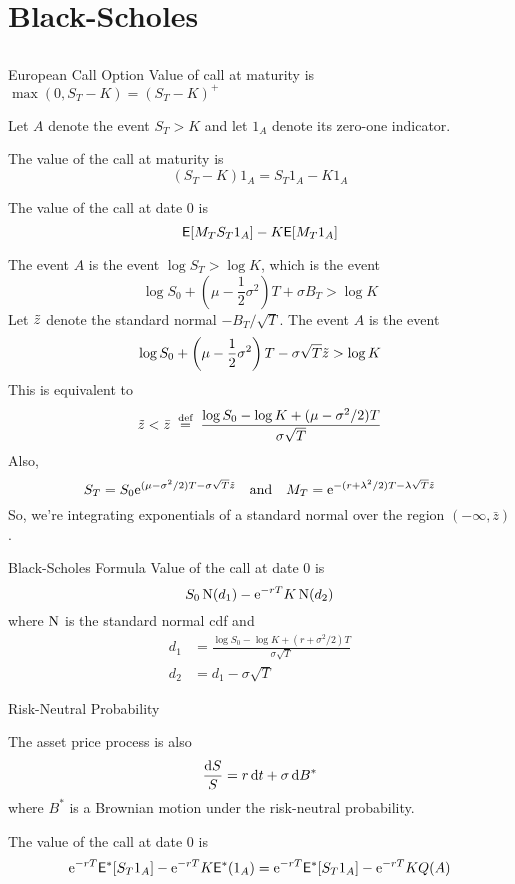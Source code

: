 \documentclass[xcolor=dvipsnames,10pt]{beamer}
\begin{document}
\section{Black-Scholes}\subsection{}
\begin{frame}{European Call Option}
Value of call at maturity is $\max(0,S_T-K)=(S_T-K)^+$

Let $A$ denote the event $S_T>K$ and let $1_A$ denote its zero-one indicator.  

The value of the call at maturity is
$$(S_T-K)1_A = S_T1_A - K1_A$$

The value of the call at date 0 is
$$\mathsf{E}[M_TS_T1_A] - K\mathsf{E}[M_T1_A]$$
\end{frame}

\begin{frame}[plain]
The event $A$ is the event $\log S_T > \log K$, which is the event
$$\log S_0 + \left(\mu - \frac{1}{2}\sigma^2\right)T + \sigma B_T > \log K$$
Let $\tilde{z}$ denote the standard normal $-B_T/\sqrt{T}$.  The event $A$ is the event
$$\log S_0 + \left(\mu - \frac{1}{2}\sigma^2\right)T - \sigma \sqrt{T}\tilde{z} > \log K$$
This is equivalent to
$$\tz < \bar{z} \eqdef \frac{\log S_0 - \log K + (\mu-\sigma^2/2)T}{\sigma\sqrt{T}}$$
Also,
$$S_T = S_0 \mathrm{e}^{(\mu-\sigma^2/2)T - \sigma\sqrt{T}\tilde{z}} \quad \text{and} \quad
M_T =  \mathrm{e}^{-(r+\lambda^2/2)T - \lambda \sqrt{T}\tilde{z}}$$
So, we're integrating exponentials of a standard normal over the region $(-\infty, \bar{z})$.


    
\end{frame}


\begin{frame}{Black-Scholes Formula}
Value of the call at date 0 is
$$S_0\operatorname{N}(d_1) - \mathrm{e}^{-rT}K\operatorname{N}(d_2)$$
where $\operatorname{N}$ is the standard normal cdf and
\begin{align*}
    d_1 &= \frac{\log S_0 - \log K + (r+\sigma^2/2)T}{\sigma\sqrt{T}}\\
    d_2 &= d_1 - \sigma\sqrt{T}
\end{align*}
    
\end{frame}

\begin{frame}{Risk-Neutral Probability}

The asset price process is also
$$\frac{\mathrm{d} S}{S} = r\,\mathrm{d} t + \sigma\,\mathrm{d} B^*$$
where $B^*$ is a Brownian motion under the risk-neutral probability.

The value of the call at date 0 is
$$\mathrm{e}^{-rT}\mathsf{E}^*[S_T1_A] - \mathrm{e}^{-rT}K\mathsf{E}^*(1_A) = \mathrm{e}^{-rT}\mathsf{E}^*[S_T1_A] - \mathrm{e}^{-rT}KQ(A)$$

\end{frame}
\end{document}
